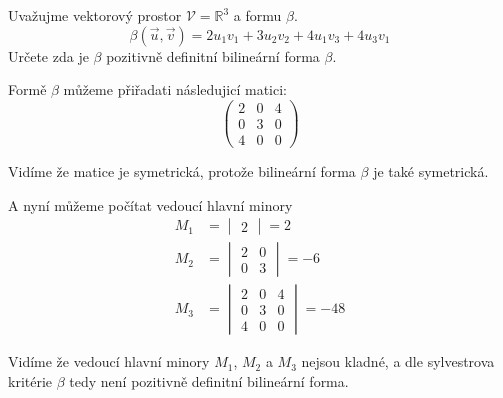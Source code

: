 \begin{example}
    Uvažujme vektorový prostor $\mathcal{V} = \mathbb{R}^3$ a formu $\beta$.
    $$\beta(\vec{u}, \vec{v}) = 2 u_1 v_1 + 3 u_2 v_2 + 4 u_1 v_3 + 4 u_3 v_1$$
    Určete zda je $\beta$ pozitivně definitní bilineární forma $\beta$.

    Formě $\beta$ můžeme přiřadati následujicí matici:
    \[
        \begin{pmatrix}
            2 & 0 & 4\\
            0 & 3 & 0\\
            4 & 0 & 0
        \end{pmatrix}
    \]

    Vidíme že matice je symetrická, protože bilineární forma $\beta$ je také symetrická.

    A nyní můžeme počítat vedoucí hlavní minory
    \begin{align*}
        M_1 &= \begin{vmatrix}
            2
        \end{vmatrix} = 2\\
        M_2 &= \begin{vmatrix}
            2 & 0\\
            0 & 3
        \end{vmatrix} = -6\\
        M_3 &= \begin{vmatrix}
            2 & 0 & 4\\
            0 & 3 & 0\\
            4 & 0 & 0
        \end{vmatrix} = -48
    \end{align*}

    Vidíme že vedoucí hlavní minory $M_1$, $M_2$ a $M_3$ nejsou kladné, a dle sylvestrova kritérie
    $\beta$ tedy není pozitivně definitní bilineární forma.
\end{example}

